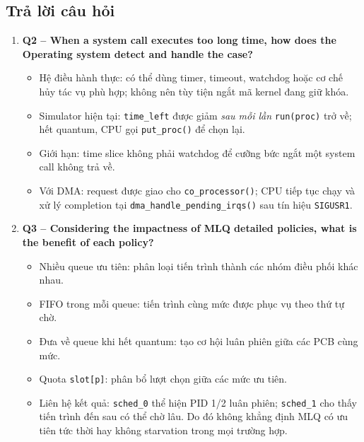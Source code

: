 \documentclass[12pt,a4paper]{article}
\begin{document}
	\subsection{Trả lời câu hỏi}
	\begin{enumerate}
     \item \textbf{Q2 -- When a system call executes too long time, how does the Operating system detect and handle the case?}
	    \begin{itemize}
	        \item Hệ điều hành thực: có thể dùng timer, timeout, watchdog hoặc cơ chế hủy tác vụ phù hợp; không nên tùy tiện ngắt mã kernel đang giữ khóa.
	        \item Simulator hiện tại: \texttt{time\_left} được giảm \emph{sau mỗi lần} \texttt{run(proc)} trở về; hết quantum, CPU gọi \texttt{put\_proc()} để chọn lại.
	        \item Giới hạn: time slice không phải watchdog để cưỡng bức ngắt một system call không trả về.
	        \item Với DMA: request được giao cho \texttt{co\_processor()}; CPU tiếp tục chạy và xử lý completion tại \texttt{dma\_handle\_pending\_irqs()} sau tín hiệu \texttt{SIGUSR1}.
	    \end{itemize}
        
	    \item \textbf{Q3 -- Considering the impactness of MLQ detailed policies, what is the benefit of each policy?}
	    \begin{itemize}
	        \item Nhiều queue ưu tiên: phân loại tiến trình thành các nhóm điều phối khác nhau.
	        \item FIFO trong mỗi queue: tiến trình cùng mức được phục vụ theo thứ tự chờ.
	        \item Đưa về queue khi hết quantum: tạo cơ hội luân phiên giữa các PCB cùng mức.
	        \item Quota \texttt{slot[p]}: phân bổ lượt chọn giữa các mức ưu tiên.
	        \item Liên hệ kết quả: \texttt{sched\_0} thể hiện PID 1/2 luân phiên; \texttt{sched\_1} cho thấy tiến trình đến sau có thể chờ lâu. Do đó không khẳng định MLQ có ưu tiên tức thời hay không starvation trong mọi trường hợp.
	    \end{itemize}
	\end{enumerate}

\end{document}
